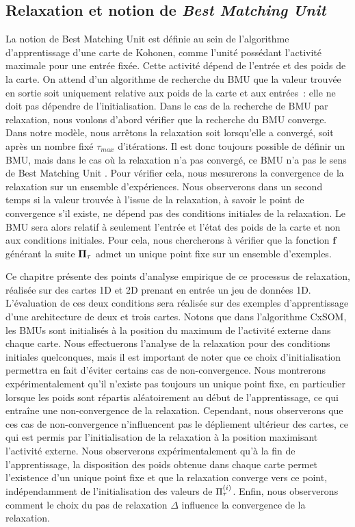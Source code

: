 \documentclass[../main]{subfiles}
\begin{document}
\subsection{Relaxation et notion de \emph{Best Matching Unit}}

La notion de Best Matching Unit est définie au sein de l'algorithme d'apprentissage d'une carte de Kohonen, comme l'unité possédant l'activité maximale pour une entrée fixée. 
Cette activité dépend de l'entrée et des poids de la carte.
On attend d'un algorithme de recherche du BMU que la valeur trouvée en sortie soit uniquement relative aux poids de la carte et aux entrées~: elle ne doit pas dépendre de l'initialisation.
Dans le cas de la recherche de BMU par relaxation, nous voulons d'abord vérifier que la recherche du BMU converge. 
Dans notre modèle, nous arrêtons la relaxation soit lorsqu'elle a convergé, soit après un nombre fixé $\tau_{max}$ d'itérations. Il est donc toujours possible de définir un BMU, mais dans le cas où la relaxation n'a pas convergé, ce BMU n'a pas le sens de \og Best Matching Unit \fg{}. Pour vérifier cela, nous mesurerons la convergence de la relaxation sur un ensemble d'expériences.
Nous observerons dans un second temps si la valeur trouvée à l'issue de la relaxation, à savoir le point de convergence s'il existe, ne dépend pas des conditions initiales de la relaxation.
Le BMU sera alors relatif à seulement l'entrée et l'état des poids de la carte et non aux conditions initiales.
Pour cela, nous chercherons à vérifier que la fonction $\mathbf{f}$ générant la suite $\mathbf{\Pi}_\tau$ admet un unique point fixe sur un ensemble d'exemples. 

Ce chapitre présente des points d'analyse empirique de ce processus de relaxation, réalisée sur des cartes 1D et 2D prenant en entrée un jeu de données 1D.
L'évaluation de ces deux conditions sera réalisée sur des exemples d'apprentissage d'une architecture de deux et trois cartes. 
Notons que dans l'algorithme CxSOM, les BMUs sont initialisés à la position du maximum de l'activité externe dans chaque carte. 
Nous effectuerons l'analyse de la relaxation pour des conditions initiales quelconques, mais il est important de noter que ce choix d'initialisation permettra en fait d'éviter certains cas de non-convergence.
Nous montrerons expérimentalement qu'il n'existe pas toujours un unique point fixe, en particulier lorsque les poids sont répartis aléatoirement au début de l'apprentissage, ce qui entraîne une non-convergence de la relaxation. 
Cependant, nous observerons que ces cas de non-convergence n'influencent pas le dépliement ultérieur des cartes, ce qui est permis par l'initialisation de la relaxation à la position maximisant l'activité externe.
Nous observerons expérimentalement qu'à la fin de l'apprentissage, la disposition des poids obtenue dans chaque carte permet l'existence d'un unique point fixe et que la relaxation converge vers ce point, indépendamment de l'initialisation des valeurs de $\Pi^{({i})}_{\tau}$.
Enfin, nous observerons comment le choix du pas de relaxation $\Delta$ influence la convergence de la relaxation.
\end{document}
